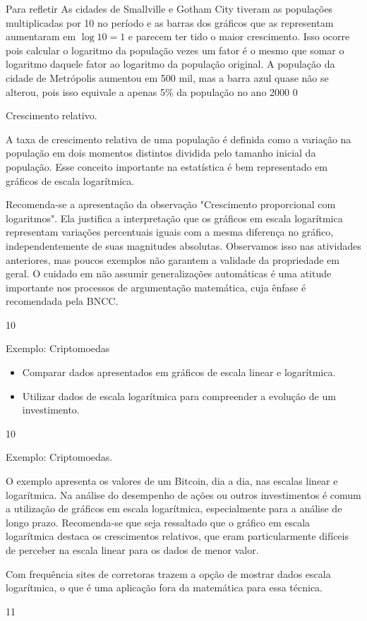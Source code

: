 \begin{answer}{Para refletir}
{As cidades de Smallville e Gotham City tiveram as populações multiplicadas por 10 no período e as barras dos gráficos que as representam aumentaram em $\log 10 =1$ e parecem ter tido o maior crescimento. Isso ocorre pois calcular o logaritmo da população vezes um fator é o mesmo que somar o logaritmo daquele fator ao logaritmo da população original. A população da cidade de Metrópolis aumentou em 500 mil, mas a barra azul quase não se alterou, pois isso equivale a apenas 5\% da população no ano 2000}
{0}
\end{answer}
\begin{sugestions}{Crescimento relativo.}
{A taxa de crescimento relativa de uma população é definida como a variação na população em dois momentos distintos dividida pelo tamanho inicial da população. Esse conceito importante na estatística é bem representado em gráficos de escala logarítmica.

Recomenda-se a apresentação da observação "Crescimento proporcional com logaritmos". Ela justifica a interpretação que os gráficos em escala logarítmica representam variações percentuais iguais com a mesma diferença no gráfico, independentemente de suas magnitudes absolutas. Observamos isso nas atividades anteriores, mas poucos exemplos não garantem a validade da propriedade em geral. O cuidado em não assumir generalizações automáticas é uma atitude importante nos processos de argumentação matemática, cuja ênfase é recomendada pela BNCC.}
{1}{0}
\end{sugestions}
\begin{objectives}{Exemplo: Criptomoedas}
{\begin{itemize}
\item Comparar dados apresentados em gráficos de escala linear e logarítmica.
\item Utilizar dados de escala logarítmica para compreender a evolução de um investimento.
\end{itemize}}
{1}{0}
\end{objectives}
\clearmargin
\begin{sugestions}{Exemplo: Criptomoedas.}
{O exemplo apresenta os valores de um Bitcoin, dia a dia, nas escalas linear e logarítmica. Na análise do desempenho de ações ou outros investimentos é comum a utilização de gráficos em escala logarítmica, especialmente para a análise de longo prazo. Recomenda-se que seja ressaltado que o gráfico em escala logarítmica destaca os crescimentos relativos, que eram particularmente difíceis de perceber na escala linear para os dados de menor valor.

Com frequência sites de corretoras trazem a opção de mostrar dados escala logarítmica, o que é uma aplicação fora da matemática para essa técnica.}
{1}{1}
\end{sugestions}

